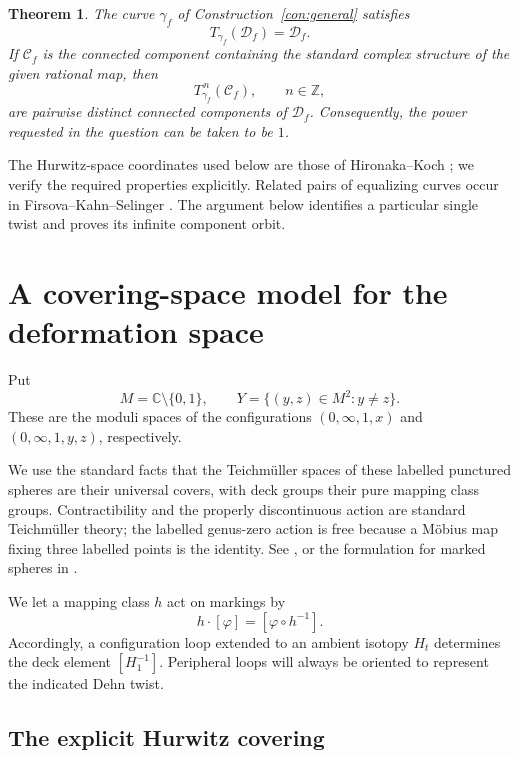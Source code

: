 \documentclass[11pt]{article}
\newcommand{\C}{\mathbb C}
\newcommand{\Z}{\mathbb Z}
\newcommand{\Def}{\mathcal D}
\newtheorem{theorem}{Theorem}[section]
\theoremstyle{definition}
\theoremstyle{remark}
\begin{document}
\begin{theorem}\label{thm:main}
The curve $\gamma_f$ of Construction~\ref{con:general} satisfies
\[
T_{\gamma_f}(\Def_f)=\Def_f.
\]
If $\mathcal C_f$ is the connected component containing the standard
complex structure of the given rational map, then
\[
T_{\gamma_f}^{\,n}(\mathcal C_f),\qquad n\in\Z,
\]
are pairwise distinct connected components of $\Def_f$.
Consequently, the power requested in the question can be taken to be
$1$.
\end{theorem}

The Hurwitz-space coordinates used below are those of
Hironaka--Koch \cite[Proposition~3.1]{HK}; we verify the required
properties explicitly.  Related pairs of equalizing curves occur in
Firsova--Kahn--Selinger \cite[Section~9, case~(12b), arXiv version]{FKS}.
The argument below identifies a particular single twist and proves
its infinite component orbit.

\section{A covering-space model for the deformation space}

Put
\[
M=\C\setminus\{0,1\},\qquad
Y=\{(y,z)\in M^2:y\ne z\}.
\]
These are the moduli spaces of the configurations
$(0,\infty,1,x)$ and $(0,\infty,1,y,z)$, respectively.

We use the standard facts that the Teichm\"uller spaces of these
labelled punctured spheres are their universal covers, with deck
groups their pure mapping class groups.  Contractibility and the
properly discontinuous action are standard Teichm\"uller theory;
the labelled genus-zero action is free because a M\"obius map fixing
three labelled points is the identity.  See
\cite[Chapters~10 and~12]{FM}, or the formulation for marked spheres in
\cite[Section~2.2]{HK}.

We let a mapping class $h$ act on markings by
\[
h\cdot[\varphi]=[\varphi\circ h^{-1}].
\]
Accordingly, a configuration loop extended to an ambient isotopy
$H_t$ determines the deck element $[H_1^{-1}]$.
Peripheral loops will always be oriented to represent the indicated
Dehn twist.

\subsection{The explicit Hurwitz covering}
\end{document}
